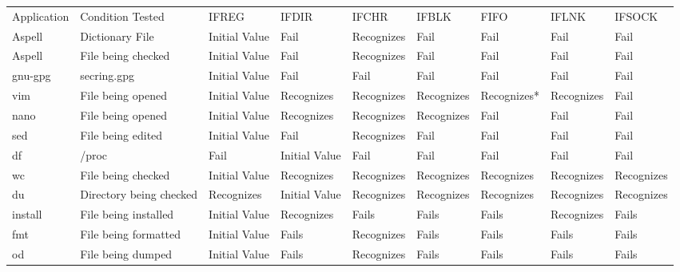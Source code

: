             \begin{table*}[t]
                \scriptsize{}
                \begin{tabular}{l  l  l  l  l  l  l  l  l}
                \toprule{}
                  Application & Condition Tested           & IFREG        & IFDIR        & IFCHR     & IFBLK    & FIFO      & IFLNK    & IFSOCK\\
                  Aspell      & Dictionary File            & Initial Value  & Fail           & Recognizes  & Fail       & Fail        & Fail       & Fail\\
                  Aspell      & File being checked         & Initial Value  & Fail           & Recognizes  & Fail       & Fail        & Fail       & Fail\\
                  gnu-gpg     & secring.gpg                & Initial Value  & Fail           & Fail        & Fail       & Fail        & Fail       & Fail\\
                  vim         & File being opened          & Initial Value  & Recognizes     & Recognizes  & Recognizes & Recognizes* & Recognizes & Fail\\
                  nano        & File being opened          & Initial Value  & Recognizes     & Recognizes  & Recognizes & Fail        & Fail       & Fail\\
                  sed         & File being edited          & Initial Value  & Fail           & Recognizes  & Fail       & Fail        & Fail       & Fail\\
                  df          & /proc                      & Fail           & Initial Value  & Fail        & Fail       & Fail        & Fail       & Fail\\
                  wc          & File being checked         & Initial Value  & Recognizes     & Recognizes  & Recognizes & Recognizes  & Recognizes & Recognizes\\
                  du          & Directory being checked    & Recognizes     & Initial Value  & Recognizes  & Recognizes & Recognizes  & Recognizes & Recognizes\\
                  install     & File being installed       & Initial Value  & Recognizes     & Fails       & Fails      & Fails       & Recognizes & Fails\\
                  fmt         & File being formatted       & Initial Value  & Fails          & Recognizes  & Fails      & Fails       & Fails      & Fails\\
                  od          & File being dumped          & Initial Value  & Fails          & Recognizes  & Fails      & Fails       & Fails      & Fails\\

\end{tabular}
\end{table*}
